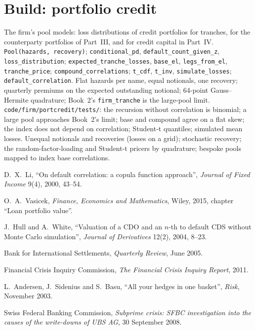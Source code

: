 \section{Build: portfolio credit}\label{bld:rc:portfolio-credit:portcredit}

\begin{build}
 The firm's pool models: loss distributions of credit portfolios for
tranches, for the counterparty portfolios of Part~III, and for credit capital in Part~IV.
 \texttt{Pool(hazards, recovery)}; \texttt{conditional\_pd},
\texttt{default\_count\_given\_z}, \texttt{loss\_distribution}; \texttt{expected\_tranche\_losses},
\texttt{base\_el}, \texttt{legs\_from\_el}, \texttt{tranche\_price};
\texttt{compound\_correlations}; \texttt{t\_cdf}, \texttt{t\_inv}, \texttt{simulate\_losses};
\texttt{default\_correlation}.
 Flat hazards per name, equal notionals, one recovery; quarterly premiums on
the expected outstanding notional; 64-point Gauss--Hermite quadrature; Book~2's
\texttt{firm\_tranche} is the large-pool limit.
 \texttt{code/firm/portcredit/tests/}: the recursion without
correlation is binomial; a large pool approaches Book~2's limit; base and compound agree
on a flat skew; the index does not depend on correlation; Student-t quantiles; simulated
mean losses.
 Unequal notionals and recoveries (losses on a grid); stochastic recovery;
the random-factor-loading and Student-t pricers by quadrature; bespoke pools mapped to
index base correlations.
\end{build}

\begin{omsources}
\item D.\ X.\ Li, ``On default correlation: a copula function approach'', \emph{Journal of
Fixed Income} 9(4), 2000, 43--54.
\item O.\ A.\ Vasicek, \emph{Finance, Economics and Mathematics}, Wiley, 2015, chapter
``Loan portfolio value''.
\item J.\ Hull and A.\ White, ``Valuation of a CDO and an $n$-th to default CDS without
Monte Carlo simulation'', \emph{Journal of Derivatives} 12(2), 2004, 8--23.
\item Bank for International Settlements, \emph{Quarterly Review}, June 2005.
\item Financial Crisis Inquiry Commission, \emph{The Financial Crisis Inquiry Report},
2011.
\item L.\ Andersen, J.\ Sidenius and S.\ Basu, ``All your hedges in one basket'', \emph{Risk},
November 2003.
\item Swiss Federal Banking Commission, \emph{Subprime crisis: SFBC investigation into the causes of the
write-downs of UBS AG}, 30 September 2008.
\end{omsources}

